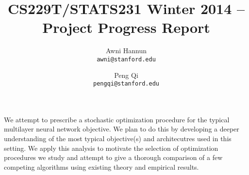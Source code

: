 \documentclass[12pt,english]{article}
\title{
{\large CS229T/STATS231 Winter 2014 -- Project Progress Report }
}
\author{ \large
Awni Hannun \\
\texttt{awni@stanford.edu}
\and
Peng Qi \\
\texttt{pengqi@stanford.edu}
}
\date{}
\newcommand{\1}{\mathbb{I}} %
\begin{document}
\maketitle

We attempt to prescribe a stochastic optimization procedure for the typical
multilayer neural network objective. We plan to do this by developing a deeper
understanding of the most typical objective(s) and architecutres used in this
setting. We apply this analysis to motivate the selection of optimization
procedures we study and attempt to give a thorough comparison of a few
competing algorithms using existing theory and empirical results. 






{}

\end{document}
